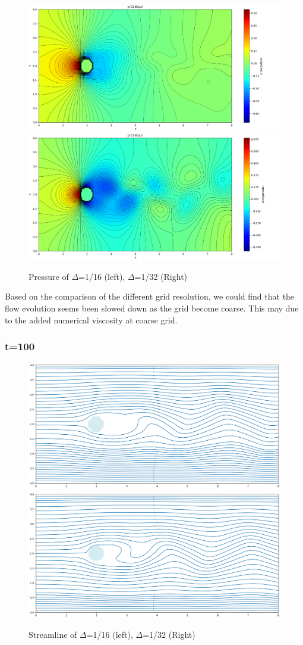 \documentclass[12pt]{article}
\begin{document}
\begin{figure}[H]
    \centering
    \includegraphics[width=0.45\linewidth]{figure/N16_Re150_8x4_t50/p_N16_Re150_8x4_t50.jpg}
    \includegraphics[width=0.45\linewidth]{figure/N32_Re150_8x4_t50/p_N32_Re150_8x4_t50.jpg}
    \caption{Pressure of $\Delta$=1/16 (left), $\Delta$=1/32 (Right)}
\end{figure}

Based on the comparison of the different grid resolution, we could find that the flow evolution seems been slowed down as the grid become coarse. This may due to the added numerical viscosity at coarse grid. 


\subsubsection{t=100}
\begin{figure}[H]
    \centering
    \includegraphics[width=0.45\linewidth]{figure/N16_Re150_8x4_t100/stline_N16_Re150_8x4_t100.jpg}
    \includegraphics[width=0.45\linewidth]{figure/N32_Re150_8x4_t100/stline_N32_Re150_8x4_t100.jpg}
    \caption{Streamline of $\Delta$=1/16 (left), $\Delta$=1/32 (Right) }
\end{figure}
\end{document}
